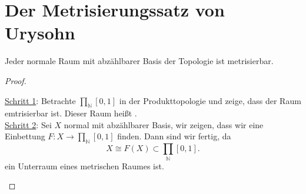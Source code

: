 \section{Der Metrisierungssatz von Urysohn}
\begin{theorem}\label{thm:metrisierungsssatz-von-urysohn}
    Jeder normale Raum mit abzählbarer Basis der Topologie ist metrisierbar.
\end{theorem}
\begin{proof}
    \begin{strategy}
        \underline{Schritt 1}: Betrachte $\prod_{\mathbb{N}} [0,1]$ in der Produkttopologie und zeige, dass der Raum emtrisierbar ist. Dieser Raum heißt .  \\
        \underline{Schritt 2}: Sei $X$ normal mit abzählbarer Basis, wir zeigen, dass wir eine Einbettung  $F : X \to  \prod_{\mathbb{N}} [0,1]$ finden.
        Dann sind wir fertig, da 
        \[
            X \cong F(X) \subset \prod_{\mathbb{N}}[0,1]
        .\] 
        ein Unterraum eines metrischen Raumes ist.
    \end{strategy}
\end{proof}

